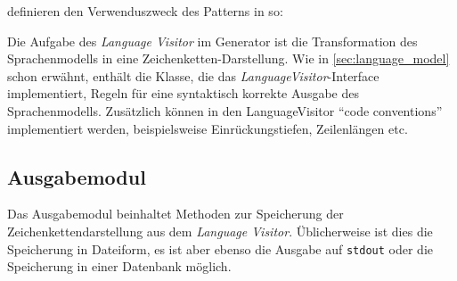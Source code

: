 \citeauthor{patternsKompakt} definieren den Verwenduszweck des Patterns in \cite[][S. 60]{patternsKompakt} so: 

Die Aufgabe des \emph{Language Visitor} im Generator ist die Transformation des Sprachenmodells in eine Zeichenketten-Darstellung. Wie in \cref{sec:language_model} schon erwähnt, enthält die Klasse, die das \emph{LanguageVisitor}-Interface implementiert, Regeln für eine syntaktisch korrekte Ausgabe des Sprachenmodells. Zusätzlich können in den LanguageVisitor \enquote{code conventions} implementiert werden, beispielsweise Einrückungstiefen, Zeilenlängen etc.

\subsection{Ausgabemodul}
\label{sec:printer_module}

Das Ausgabemodul beinhaltet Methoden zur Speicherung der Zeichenkettendarstellung aus dem \emph{Language Visitor}. Üblicherweise ist dies die Speicherung in Dateiform, es ist aber ebenso die Ausgabe auf \texttt{stdout} oder die Speicherung in einer Datenbank möglich.
